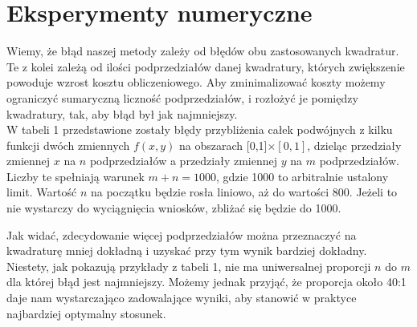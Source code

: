 \documentclass[a4paper,12pt]{article}
\begin{document}
\section*{Eksperymenty numeryczne}
Wiemy, że błąd naszej metody zależy od błędów obu zastosowanych kwadratur. Te z kolei  zależą od  ilości podprzedziałów danej kwadratury, których zwiększenie powoduje wzrost kosztu obliczeniowego. Aby zminimalizować koszty możemy ograniczyć sumaryczną liczność podprzedziałów, i rozłożyć je pomiędzy kwadratury, tak, aby błąd był jak najmniejszy.\\
W tabeli 1 przedstawione zostały błędy przybliżenia   całek podwójnych z kilku funkcji dwóch zmiennych  $f(x,y)$ na obszarach [0,1]$\times[0,1]$, dzieląc przedziały zmiennej $x$ na $n$ podprzedziałów a przedziały zmiennej $y$ na $m$ podprzedziałów. Liczby te spełniają warunek $m+n=1000$, gdzie 1000 to arbitralnie ustalony limit. Wartość $n$ na początku będzie rosła liniowo, aż do wartości 800.  Jeżeli
to nie wystarczy do wyciągnięcia wniosków, zbliżać się będzie do 1000.
\par Jak widać, zdecydowanie więcej podprzedziałów można przeznaczyć na kwadraturę mniej dokładną i uzyskać przy tym wynik bardziej dokładny. Niestety, jak pokazują przykłady  z tabeli 1, nie ma uniwersalnej proporcji $n$ do $m$ dla której błąd jest  najmniejszy. Możemy jednak przyjąć, że proporcja około 40:1 daje nam wystarczająco  zadowalające wyniki, aby stanowić w praktyce najbardziej optymalny stosunek.
\end{document}
